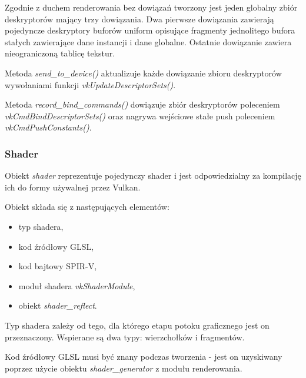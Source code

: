 Zgodnie z duchem renderowania bez dowiązań tworzony jest jeden globalny zbiór deskryptorów mający trzy dowiązania. Dwa pierwsze dowiązania zawierają pojedyncze deskryptory buforów uniform opisujące fragmenty jednolitego bufora stałych zawierające dane instancji i dane globalne. 
Ostatnie dowiązanie zawiera nieograniczoną tablicę tekstur.

Metoda \textit{send\_to\_device()} aktualizuje każde dowiązanie zbioru deskryptorów wywołaniami funkcji \textit{vkUpdateDescriptorSets()}.

Metoda \textit{record\_bind\_commands()} dowiązuje zbiór deskryptorów poleceniem \textit{vkCmdBindDescriptorSets()} oraz nagrywa wejściowe stałe push poleceniem \textit{vkCmdPushConstants()}.



\subsubsection{Shader}

Obiekt \textit{shader} reprezentuje pojedynczy shader i jest odpowiedzialny za kompilację ich do formy używalnej przez Vulkan.

Obiekt składa się z następujących elementów:
\begin{itemize}
	\item typ shadera,
	\item kod źródłowy GLSL,
	\item kod bajtowy SPIR-V,
	\item moduł shadera \textit{vkShaderModule},
	\item obiekt \textit{shader\_reflect}.
\end{itemize}

Typ shadera zależy od tego, dla którego etapu potoku graficznego jest on przeznaczony.
Wspierane są dwa typy: wierzchołków i fragmentów.

Kod źródłowy GLSL musi być znany podczas tworzenia - jest on uzyskiwany poprzez użycie obiektu \textit{shader\_generator} z modułu renderowania.

